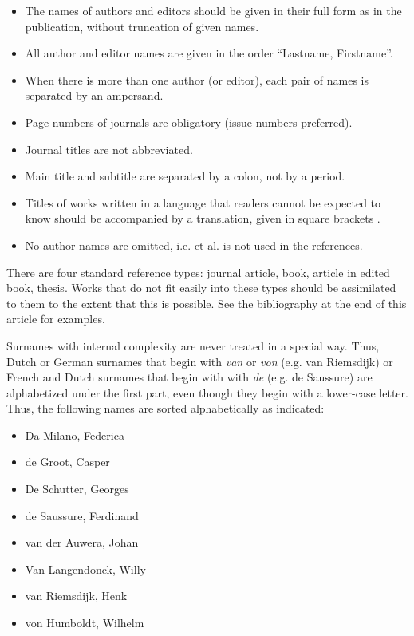\documentclass[charis,linguex]{glossa}
\begin{document}
\begin{itemize}
\item The names of authors and editors should be given in their full form as in the publication, without truncation of given names.
\item All author and editor names are given in the order ``Lastname, Firstname''.
\item When there is more than one author (or editor), each pair of names is separated by an ampersand.
\item Page numbers of journals are obligatory (issue numbers preferred).
\item Journal titles are not abbreviated.
\item Main title and subtitle are separated by a colon, not by a period.
\item Titles of works written in a language that readers cannot be expected to know should be accompanied by a translation, given in square brackets \citep{Li1999}.
\item No author names are omitted, i.e. et al. is not used in the references.
\end{itemize}

There are four standard reference types: journal article, book, article in edited book, thesis. Works that do not fit easily into these types should be assimilated to them to the extent that this is possible. See the bibliography at the end of this article for examples.

Surnames with internal complexity are never treated in a special way. Thus, Dutch or German surnames that begin with \textit{van} or \textit{von} (e.g. van Riemsdijk) or French and Dutch surnames that begin with with \textit{de} (e.g. de Saussure) are alphabetized under the first part, even though they begin with a lower-case letter. Thus, the following names are sorted alphabetically as indicated:

\begin{itemize}
\item Da Milano, Federica
\item de Groot, Casper
\item De Schutter, Georges
\item de Saussure, Ferdinand
\item van der Auwera, Johan
\item Van Langendonck, Willy
\item van Riemsdijk, Henk
\item von Humboldt, Wilhelm
\end{itemize}
\end{document}

